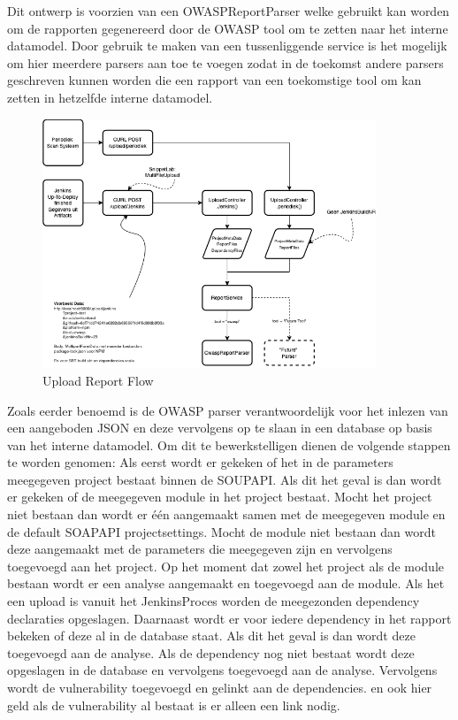 Dit ontwerp is voorzien van een OWASPReportParser welke gebruikt kan worden om de rapporten gegenereerd door de OWASP tool om te zetten naar het interne datamodel. Door gebruik te maken van een tussenliggende service is het mogelijk om hier meerdere parsers aan toe te voegen zodat in de toekomst andere parsers geschreven kunnen worden die een rapport van een toekomstige tool om kan zetten in hetzelfde interne datamodel.
\begin{figure}[H]
    \myfloatalign
    \includegraphics[width=10cm]{gfx/SOUPAPI-UploadAnalysis}
    \caption{Upload Report Flow}
    \label{fig:UploadReportFlow}
\end{figure}
Zoals eerder benoemd is de OWASP parser verantwoordelijk voor het inlezen van een aangeboden JSON en deze vervolgens op te slaan in een database op basis van het interne datamodel. Om dit te bewerkstelligen dienen de volgende stappen te worden genomen:
Als eerst wordt er gekeken of het in de parameters meegegeven project bestaat binnen de SOUPAPI. Als dit het geval is dan wordt er gekeken of de meegegeven module in het project bestaat. Mocht het project niet bestaan dan wordt er één aangemaakt samen met de meegegeven module en de default SOAPAPI projectsettings. Mocht de module niet bestaan dan wordt deze aangemaakt met de parameters die meegegeven zijn en vervolgens toegevoegd aan het project.
Op het moment dat zowel het project als de module bestaan wordt er een analyse aangemaakt en toegevoegd aan de
module. Als het een upload is vanuit het JenkinsProces worden de meegezonden dependency declaraties opgeslagen. Daarnaast wordt er voor iedere dependency in het rapport bekeken of deze al in de database staat. Als dit het geval is dan wordt deze toegevoegd aan de analyse. Als de dependency nog niet bestaat wordt deze opgeslagen in de database en vervolgens toegevoegd aan de analyse. Vervolgens wordt de vulnerability toegevoegd en gelinkt aan de dependencies. en ook hier geld als de vulnerability al bestaat is er alleen een link nodig.
